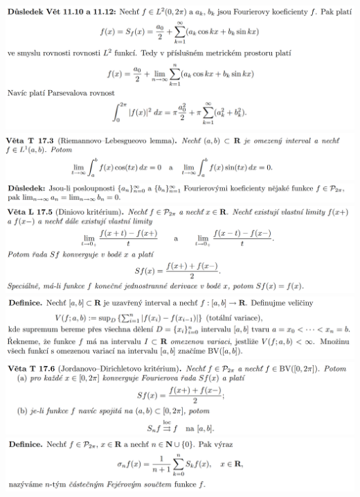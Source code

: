 \documentclass[12pt,a4paper]{article}
\begin{document}
\begin{center}
		\includegraphics[width=\textwidth]{img/4four/2020-06-21 11 44 17.png}\vspace{0.3cm}
		\includegraphics[width=\textwidth]{img/4four/2020-06-21 11 46 20.png}\vspace{0.3cm}
		\includegraphics[width=\textwidth]{img/4four/2020-06-21 11 46 38.png}\vspace{0.3cm}
		\includegraphics[width=\textwidth]{img/4four/2020-06-21 11 47 24.png}\vspace{0.3cm}
		\includegraphics[width=\textwidth]{img/4four/2020-06-21 11 48 27.png}\vspace{0.3cm}
		\includegraphics[width=\textwidth]{img/4four/2020-06-21 11 47 48.png}\vspace{0.3cm}
		\includegraphics[width=\textwidth]{img/4four/2020-06-21 11 49 28.png}\vspace{0.3cm}

\end{center}
\end{document}
